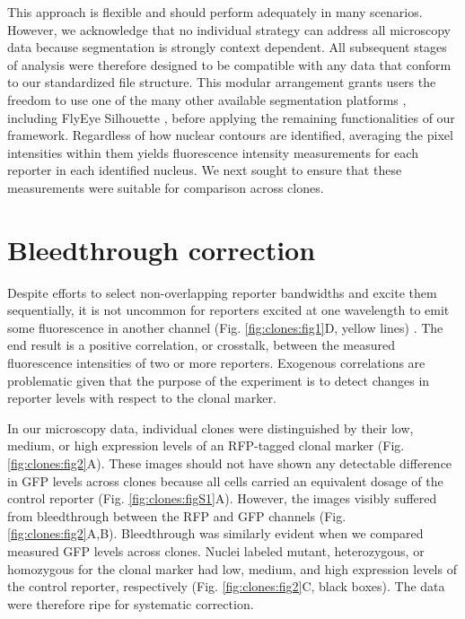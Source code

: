 This approach is flexible and should perform adequately in many scenarios. However, we acknowledge that no individual strategy can address all microscopy data because segmentation is strongly context dependent. All subsequent stages of analysis were therefore designed to be compatible with any data that conform to our standardized file structure. This modular arrangement grants users the freedom to use one of the many other available segmentation platforms \cite{Bugarski2014}, including FlyEye Silhouette \cite{Pelaez2015a}, before applying the remaining functionalities of our framework. Regardless of how nuclear contours are identified, averaging the pixel intensities within them yields fluorescence intensity measurements for each reporter in each identified nucleus. We next sought to ensure that these measurements were suitable for comparison across clones.

\section{Bleedthrough correction}
\label{ch:clones:correction}

Despite efforts to select non-overlapping reporter bandwidths and excite them sequentially, it is not uncommon for reporters excited at one wavelength to emit some fluorescence in another channel (Fig. \ref{fig:clones:fig1}D, yellow lines) \cite{Bacia2012,Zinchuk2007}. The end result is a positive correlation, or crosstalk, between the measured fluorescence intensities of two or more reporters. Exogenous correlations are problematic given that the purpose of the experiment is to detect changes in reporter levels with respect to the clonal marker.

In our microscopy data, individual clones were distinguished by their low, medium, or high expression levels of an RFP-tagged clonal marker (Fig. \ref{fig:clones:fig2}A). These images should not have shown any detectable difference in GFP levels across clones because all cells carried an equivalent dosage of the control reporter (Fig. \ref{fig:clones:figS1}A). However, the images visibly suffered from bleedthrough between the RFP and GFP channels (Fig. \ref{fig:clones:fig2}A,B). Bleedthrough was similarly evident when we compared measured GFP levels across clones. Nuclei labeled mutant, heterozygous, or homozygous for the clonal marker had low, medium, and high expression levels of the control reporter, respectively (Fig. \ref{fig:clones:fig2}C, black boxes). The data were therefore ripe for systematic correction.

